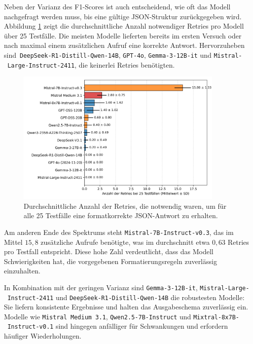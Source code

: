 Neben der Varianz des F1-Scores ist auch entscheidend, wie oft das Modell nachgefragt werden muss, bis eine gültige JSON-Struktur zurückgegeben wird. Abbildung \ref{fig:results_evaluation_amount_of_retries} zeigt die durchschnittliche Anzahl notwendiger Retries pro Modell über 25 Testfälle. Die meisten Modelle lieferten bereits im ersten Versuch oder nach maximal einem zusätzlichen Aufruf eine korrekte Antwort. Hervorzuheben sind\linebreak~\texttt{DeepSeek-R1-Distill-Qwen-14B}, \texttt{GPT-4o}, \texttt{Gemma-3-12B-it} und \texttt{Mistral-\linebreak~Large-Instruct-2411}, die keinerlei Retries benötigten.

\begin{figure}[htbp]
    \centering
    \includegraphics[width=0.9\textwidth]{images/results/evaluation_amount_of_retries}
    \caption{Durchschnittliche Anzahl der Retries, die notwendig waren, um für alle 25 Testfälle eine formatkorrekte JSON-Antwort zu erhalten.}
    \label{fig:results_evaluation_amount_of_retries}
\end{figure}

Am anderen Ende des Spektrums steht \texttt{Mistral-7B-Instruct-v0.3}, das im Mittel $15{,}8$ zusätzliche Aufrufe benötigte, was im durchschnitt etwa $0{,}63$ Retries pro Testfall entspricht. Diese hohe Zahl verdeutlicht, dass das Modell Schwierigkeiten hat, die vorgegebenen Formatierungsregeln zuverlässig einzuhalten.

In Kombination mit der geringen Varianz sind \texttt{Gemma-3-12B-it}, \texttt{Mistral-Large-\linebreak~Instruct-2411} und \texttt{DeepSeek-R1-Distill-Qwen-14B} die robustesten Modelle: Sie liefern konsistente Ergebnisse und halten das Ausgabeschema zuverlässig ein. Modelle wie \texttt{Mistral Medium 3.1}, \texttt{Qwen2.5-7B-Instruct} und \texttt{Mixtral-8x7B-\linebreak~Instruct-v0.1} sind hingegen anfälliger für Schwankungen und erfordern häufiger Wiederholungen.